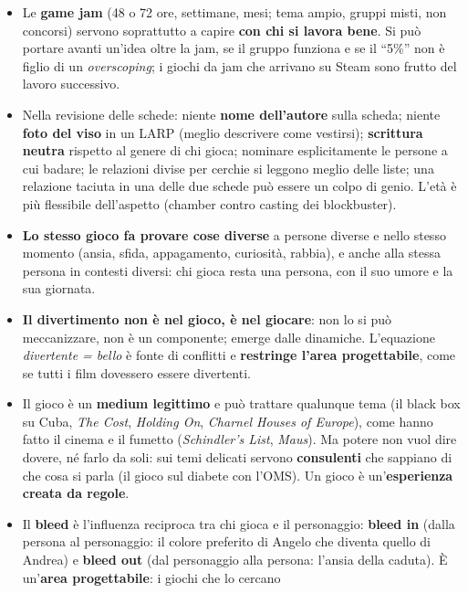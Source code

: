 \begin{itemize}
  \item Le \textbf{game jam} (48 o 72 ore, settimane, mesi; tema ampio, gruppi misti, non
        concorsi) servono soprattutto a capire \textbf{con chi si lavora bene}. Si può
        portare avanti un'idea oltre la jam, se il gruppo funziona e se il ``5\%'' non è
        figlio di un \emph{overscoping}; i giochi da jam che arrivano su Steam sono frutto
        del lavoro successivo.
  \item Nella revisione delle schede: niente \textbf{nome dell'autore} sulla scheda;
        niente \textbf{foto del viso} in un LARP (meglio descrivere come vestirsi);
        \textbf{scrittura neutra} rispetto al genere di chi gioca; nominare esplicitamente
        le persone a cui badare; le relazioni divise per cerchie si leggono meglio delle
        liste; una relazione taciuta in una delle due schede può essere un colpo di genio.
        L'età è più flessibile dell'aspetto (chamber contro casting dei blockbuster).
  \item \textbf{Lo stesso gioco fa provare cose diverse} a persone diverse e nello stesso
        momento (ansia, sfida, appagamento, curiosità, rabbia), e anche alla stessa persona
        in contesti diversi: chi gioca resta una persona, con il suo umore e la sua
        giornata.
  \item \textbf{Il divertimento non è nel gioco, è nel giocare}: non lo si può
        meccanizzare, non è un componente; emerge dalle dinamiche. L'equazione
        \emph{divertente = bello} è fonte di conflitti e \textbf{restringe l'area
        progettabile}, come se tutti i film dovessero essere divertenti.
  \item Il gioco è un \textbf{medium legittimo} e può trattare qualunque tema (il black
        box su Cuba, \emph{The Cost}, \emph{Holding On}, \emph{Charnel Houses of Europe}),
        come hanno fatto il cinema e il fumetto (\emph{Schindler's List}, \emph{Maus}).
        Ma potere non vuol dire dovere, né farlo da soli: sui temi delicati servono
        \textbf{consulenti} che sappiano di che cosa si parla (il gioco sul diabete con
        l'OMS). Un gioco è un'\textbf{esperienza creata da regole}.
  \item Il \textbf{bleed} è l'influenza reciproca tra chi gioca e il personaggio:
        \textbf{bleed in} (dalla persona al personaggio: il colore preferito di Angelo che
        diventa quello di Andrea) e \textbf{bleed out} (dal personaggio alla persona:
        l'ansia della caduta). È un'\textbf{area progettabile}: i giochi che lo cercano

\end{itemize}
